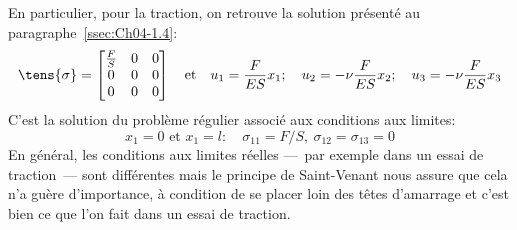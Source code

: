En particulier, pour la traction, on retrouve la solution présenté au paragraphe~\ref{ssec:Ch04-1.4}:
\begin{equation}
    \tens{\sigma} = 
    \begin{bmatrix}
        \frac{F}{S} & 0 & 0 \\
        0 & 0 & 0 \\
        0 & 0 & 0
    \end{bmatrix}
    \quad\text{et}\quad
        u_1 = \frac{F}{ES} x_1;\quad
        u_2 = -\nu \frac{F}{ES} x_2;\quad
        u_3 = -\nu \frac{F}{ES}  x_3
    \label{eq:Ch07-023}
\end{equation}
C'est la solution du problème régulier associé aux conditions aux limites:
\begin{equation}
    x_1 = 0 \text{ et } x_1 = l: \quad \sigma_{11} = F/S, \ \sigma_{12} = \sigma_{13} = 0
    \label{eq:Ch07-024}
\end{equation}
En général, les conditions aux limites réelles ---~par exemple dans un essai de traction~--- sont différentes mais le principe de Saint-Venant nous assure que cela n'a guère d'importance, à condition de se placer loin des têtes d'amarrage et c'est bien ce que l'on fait dans un essai de traction.

